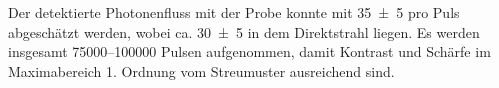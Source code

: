 \noindent
Der detektierte Photonenfluss mit der Probe konnte mit \SI{35(5)}{\photons} pro Puls abgeschätzt werden, wobei ca. \SI{30(5)}{\photons} in dem Direktstrahl liegen. Es werden insgesamt \numrange{75000}{100000} Pulsen aufgenommen, damit Kontrast und Schärfe im Maximabereich 1. Ordnung vom Streumuster ausreichend sind. 

